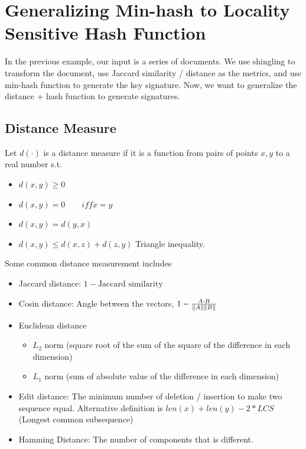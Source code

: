 \section{Generalizing Min-hash to Locality Sensitive Hash Function} 
In the previous example, our input is a series of documents. We use shingling to transform the document,  use Jaccard similarity / distance as the metrics, and use min-hash function to generate the key signature. Now, we want to generalize the distance + hash function to generate signatures. 

\subsection{Distance Measure}
Let $d(\cdot)$ is a distance measure if it is a function from pairs of points $x, y$ to a real number s.t.
    \begin{itemize}
        \item $d(x,y)\geq 0$
        \item $d(x,y) = 0 \qquad iff x=y$
        \item $d(x,y) = d(y,x)$
        \item $d(x,y) \leq d(x,z) + d(z,y)$ Triangle inequality. 
    \end{itemize}

Some common distance measurement includes
    \begin{itemize}
        \item Jaccard distance: $1 - \text{Jaccard similarity}$
        \item Cosin distance: Angle between the vectors, $1 - \frac{A \cdot B}{\left\lVert A\right\rVert\left\lVert B\right\rVert}$
        \item Euclidean distance 
            \begin{itemize}
                \item $L_2$ norm (square root of the sum of the square of the difference in each dimension)
                \item $L_1$ norm (sum of absolute value of the difference in each dimension)
            \end{itemize}
        \item Edit distance: The minimum number of deletion / insertion to make two sequence equal. Alternative definition is $len(x) + len(y) - 2 * LCS$ (Longest common subsequence)
        \item Hamming Distance: The number of components that is different. 
    \end{itemize}



